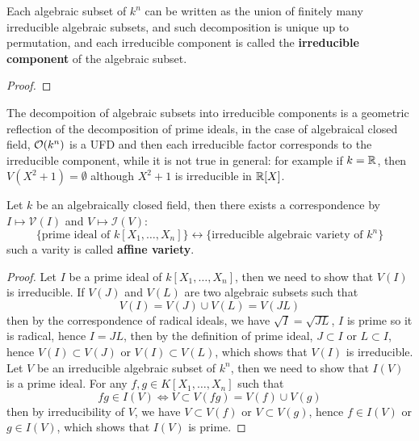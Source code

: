 \begin{lemma}
    Each algebraic subset of \(k^n\) can be written as the union of finitely many irreducible algebraic subsets, and such decomposition is unique up to permutation, and each irreducible component is called the \textbf{irreducible component} of the algebraic subset.
\end{lemma}

\begin{proof}
    
\end{proof}

\begin{remark}
    The decompoition of algebraic subsets into irreducible components is a geometric reflection of the decomposition of prime ideals, in the case of algebraical closed field, \(\mathcal{O}(k^n)\) is a UFD and then each irreducible factor corresponds to the irreducible component, while it is not true in general: for example if \(k = \mathbb{R}\), then \(V(X^2+1) = \emptyset\) although \(X^2+1\) is irreducible in \(\mathbb{R}[X]\).
\end{remark}

\begin{colorproposition}
    Let \(k\) be an algebraically closed field, then there exists a correspondence by \(I \mapsto \mathcal{V}(I)\) and \(V \mapsto \mathcal{I}(V)\):
    \[\{\text{prime ideal of } k[X_1,\dots,X_n]\} \longleftrightarrow \{\text{irreducible algebraic variety of } k^n\}\]
    such a varity is called \textbf{affine variety}. 
\end{colorproposition}
\begin{proof}
    Let \(I\) be a prime ideal of \(k[X_1,\dots,X_n]\), then we need to show that \(V(I)\) is irreducible. If \(V(J)\) and \(V(L)\) are two algebraic subsets such that
    \[V(I) = V(J) \cup V(L) = V(JL)\]
    then by the correspondence of radical ideals, we have \(\sqrt{I} = \sqrt{JL}\), \(I\) is prime so it is radical, hence \(I = JL\), then by the definition of prime ideal, \(J \subset I\) or \(L \subset I\), hence \(V(I) \subset V(J)\) or \(V(I) \subset V(L)\), which shows that \(V(I)\) is irreducible.\\

    Let \(V\) be an irreducible algebraic subset of \(k^n\), then we need to show that \(I(V)\) is a prime ideal. For any \(f,g \in K[X_1,\dots,X_n]\) such that
    \[fg \in I(V) \iff V \subset V(fg) = V(f) \cup V(g)\]
    then by irreducibility of \(V\), we have \(V \subset V(f)\) or \(V \subset V(g)\), hence \(f \in I(V)\) or \(g \in I(V)\), which shows that \(I(V)\) is prime.
\end{proof}

